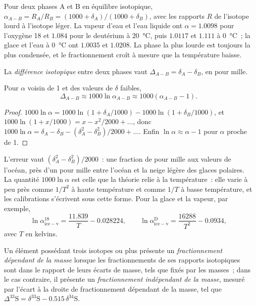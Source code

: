 Pour deux phases A et B en équilibre isotopique, $\alpha_{A-B} = R_A/R_B =
(1000 + \delta_A)/(1000 + \delta_B)$, avec les rapports $R$ de l'isotope lourd à l'isotope léger.
La vapeur d'eau et l'eau liquide ont $\alpha = 1.0098$ pour l'oxygène 18 et
$1.084$ pour le deutérium à \qty{20}{\celsius}, puis $1.0117$ et $1.111$ à
\qty{0}{\celsius}~; la glace et l'eau à \qty{0}{\celsius} ont $1.0035$ et $1.0208$.
La phase la plus lourde est toujours la plus condensée, et le fractionnement
croît à mesure que la température baisse.

\begin{definition}\label{def:b3:stable-isotopes:big-delta}
La \emph{différence isotopique}
entre deux phases vaut $\Delta_{A-B} = \delta_A - \delta_B$, en pour mille.
\end{definition}

\begin{proposition}
\label{prop:b3:stable-isotopes:big-delta}
Pour $\alpha$ voisin de 1 et des valeurs de $\delta$ faibles,
\[
\Delta_{A-B} \approx 1000\ln\alpha_{A-B} \approx 1000(\alpha_{A-B} - 1).
\]
\end{proposition}

\begin{proof}
$1000\ln\alpha = 1000\ln(1 + \delta_A/1000) - 1000\ln(1 + \delta_B/1000)$, et
$1000\ln(1 + x/1000) = x - x^2/2000 + \dots$, donc $1000\ln\alpha = \delta_A -
\delta_B - (\delta_A^2 - \delta_B^2)/2000 + \dots$. Enfin $\ln\alpha \approx
\alpha - 1$ pour $\alpha$ proche de 1.
\end{proof}

L'erreur vaut $(\delta_A^2 - \delta_B^2)/2000$~: une fraction de pour mille aux valeurs de l'océan,
près d'un pour mille entre l'océan et la neige légère
des glaces polaires.
La quantité $1000\ln\alpha$ est celle que la théorie relie à la température~: elle
varie à peu près comme $1/T^2$ à haute température et comme $1/T$ à basse température,
et les calibrations s'écrivent sous cette forme. Pour la glace et la vapeur, par exemple,
\[
\ln\alpha^{18}_{\mathrm{ice-v}} = \frac{11.839}{T} - 0.028224, \qquad
\ln\alpha^{\mathrm D}_{\mathrm{ice-v}} = \frac{16288}{T^2} - 0.0934,
\]
avec $T$ en kelvins.

\begin{definition}\label{def:b3:stable-isotopes:mif}
Un élément possédant trois isotopes ou plus présente un \emph{fractionnement dépendant
de la masse} lorsque les fractionnements de
ses rapports isotopiques sont dans le rapport de leurs écarts de masse, tels que fixés par les
masses~; dans le cas contraire, il présente un \emph{fractionnement indépendant
de la masse}, mesuré par l'écart à la droite
de fractionnement dépendant de la masse, tel que $\Delta^{33}\mathrm S = \delta^{33}\mathrm S
- 0.515\,\delta^{34}\mathrm S$.
\end{definition}

